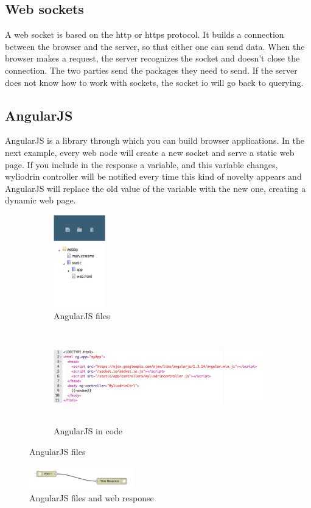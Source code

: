 \subsection{Web sockets}
A web socket is based on the http or https protocol. It builds a connection between the browser and the server, so that either one can send data. When the browser makes a request, the server recognizes the socket and doesn't close the connection. The two parties send the packages they need to send. If the server does not know how to work with sockets, the socket io will go back to querying.

\subsection{AngularJS}
AngularJS is a library through which you can build browser applications. In the next example, every web node will create a new socket and serve a static web page. If you include in the response a variable, and this variable changes, wyliodrin controller will be notified every time this kind of novelty appears and AngularJS will replace the old value of the variable with the new one, creating a dynamic web page.

\begin{figure}[ht]

\begin{subfigure}{0.5\textwidth}
    \includegraphics[width=0.9\linewidth, height=4cm]{figures/AngularJS files.png}
    \caption{AngularJS files}
\end{subfigure}
\begin{subfigure}{0.4\textwidth}
    \includegraphics[width=0.9\linewidth, height=4cm]{figures/AngularJS in code.png}
    \caption{AngularJS in code}
\end{subfigure}

\caption{AngularJS files}
\end{figure}

\begin{figure}[ht]
    \centering
    \includegraphics[width=0.4\textwidth]{figures/AngularJS files and web response.png}
    \caption{AngularJS files and web response}
\end{figure}


